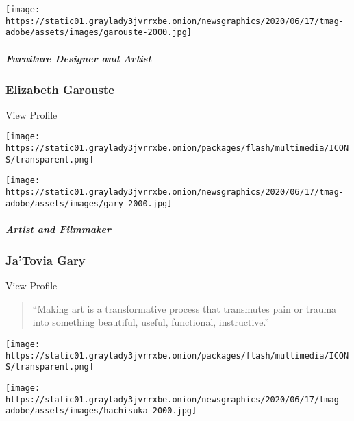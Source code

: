 \texttt{[image: https://static01.graylady3jvrrxbe.onion/newsgraphics/2020/06/17/tmag-adobe/assets/images/garouste-2000.jpg]}

\href{https://www.nytimes3xbfgragh.onion/2020/08/10/t-magazine/elizabeth-garouste-interior-design.html}{}

\hypertarget{furniture-designer-and-artist}{%
\subparagraph{Furniture Designer and
Artist}\label{furniture-designer-and-artist}}

\hypertarget{elizabeth-garouste}{%
\subsubsection{Elizabeth Garouste}\label{elizabeth-garouste}}

View Profile

\href{https://www.nytimes3xbfgragh.onion/2020/08/10/t-magazine/jatovia-gary-film.html}{}

\texttt{[image: https://static01.graylady3jvrrxbe.onion/packages/flash/multimedia/ICONS/transparent.png]}

\texttt{[image: https://static01.graylady3jvrrxbe.onion/newsgraphics/2020/06/17/tmag-adobe/assets/images/gary-2000.jpg]}

\href{https://www.nytimes3xbfgragh.onion/2020/08/10/t-magazine/jatovia-gary-film.html}{}

\hypertarget{artist-and-filmmaker}{%
\subparagraph{Artist and Filmmaker}\label{artist-and-filmmaker}}

\hypertarget{jatovia-gary}{%
\subsubsection{Ja'Tovia Gary}\label{jatovia-gary}}

View Profile

\begin{quote}
``Making art is a transformative process that transmutes pain or trauma
into something beautiful, useful, functional, instructive.''
\end{quote}

\href{https://www.nytimes3xbfgragh.onion/2020/08/10/t-magazine/aiko-hachisuka-art-sculpture.html}{}

\texttt{[image: https://static01.graylady3jvrrxbe.onion/packages/flash/multimedia/ICONS/transparent.png]}

\texttt{[image: https://static01.graylady3jvrrxbe.onion/newsgraphics/2020/06/17/tmag-adobe/assets/images/hachisuka-2000.jpg]}

